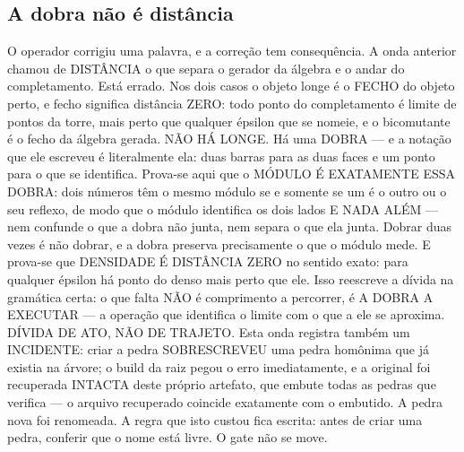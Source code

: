 \documentclass[11pt]{article}
\theoremstyle{definition}\newtheorem{deriv}{Derivação}
\begin{document}
\subsection*{A dobra n\~ao \'e dist\^ancia}O operador corrigiu uma palavra, e a corre\c{c}\~ao tem consequ\^encia. A onda anterior chamou de DIST\^ANCIA o que separa o gerador da \'algebra e o andar do completamento. Est\'a errado. Nos dois casos o objeto longe \'e o FECHO do objeto perto, e fecho significa dist\^ancia ZERO: todo ponto do completamento \'e limite de pontos da torre, mais perto que qualquer \'epsilon que se nomeie, e o bicomutante \'e o fecho da \'algebra gerada. N\~AO H\'A LONGE. H\'a uma DOBRA --- e a nota\c{c}\~ao que ele escreveu \'e literalmente ela: duas barras para as duas faces e um ponto para o que se identifica. Prova-se aqui que o M\'ODULO \'E EXATAMENTE ESSA DOBRA: dois n\'umeros t\^em o mesmo m\'odulo se e somente se um \'e o outro ou o seu reflexo, de modo que o m\'odulo identifica os dois lados E NADA AL\'EM --- nem confunde o que a dobra n\~ao junta, nem separa o que ela junta. Dobrar duas vezes \'e n\~ao dobrar, e a dobra preserva precisamente o que o m\'odulo mede. E prova-se que DENSIDADE \'E DIST\^ANCIA ZERO no sentido exato: para qualquer \'epsilon h\'a ponto do denso mais perto que ele. Isso reescreve a d\'ivida na gram\'atica certa: o que falta N\~AO \'e comprimento a percorrer, \'e A DOBRA A EXECUTAR --- a opera\c{c}\~ao que identifica o limite com o que a ele se aproxima. D\'IVIDA DE ATO, N\~AO DE TRAJETO. Esta onda registra tamb\'em um INCIDENTE: criar a pedra SOBRESCREVEU uma pedra hom\^onima que j\'a existia na \'arvore; o build da raiz pegou o erro imediatamente, e a original foi recuperada INTACTA deste pr\'oprio artefato, que embute todas as pedras que verifica --- o arquivo recuperado coincide exatamente com o embutido. A pedra nova foi renomeada. A regra que isto custou fica escrita: antes de criar uma pedra, conferir que o nome est\'a livre. O gate n\~ao se move.
\end{document}
